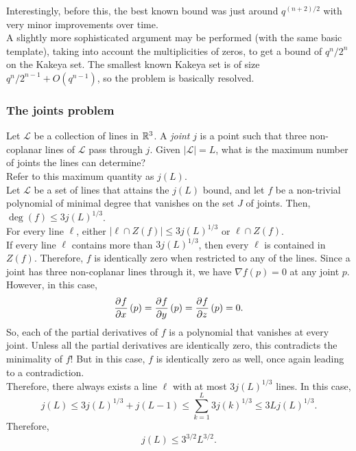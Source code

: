 		Interestingly, before this, the best known bound was just around $q^{(n+2)/2}$ with very minor improvements over time.\\
		A slightly more sophisticated argument may be performed (with the same basic template), taking into account the multiplicities of zeros, to get a bound of $q^n/2^n$ on the Kakeya set. The smallest known Kakeya set is of size $q^n/2^{n-1} + O(q^{n-1})$, so the problem is basically resolved.

	\subsubsection{The joints problem}

		Let $\mathcal{L}$ be a collection of lines in $\mathbb{R}^3$. A \emph{joint} $j$ is a point such that three non-coplanar lines of $\mathcal{L}$ pass through $j$. Given $|\mathcal{L}| = L$, what is the maximum number of joints the lines can determine? \\

		Refer to this maximum quantity as $j(L)$.\\
		Let $\mathcal{L}$ be a set of lines that attains the $j(L)$ bound, and let $f$ be a non-trivial polynomial of minimal degree that vanishes on the set $J$ of joints. Then, $\deg(f) \le 3j(L)^{1/3}$.\\

		For every line $\ell$, either $|\ell \cap Z(f)| \le 3j(L)^{1/3}$ or $\ell \cap Z(f)$.\\
		If every line $\ell$ contains more than $3j(L)^{1/3}$, then every $\ell$ is contained in $Z(f)$. Therefore, $f$ is identically zero when restricted to any of the lines. Since a joint has three non-coplanar lines through it, we have $\nabla f (p) = 0$ at any joint $p$. However, in this case,
		\[ \dpd{f}{x} (p) = \dpd{f}{y} (p) = \dpd{f}{z} (p) = 0. \]
		So, each of the partial derivatives of $f$ is a polynomial that vanishes at every joint. Unless all the partial derivatives are identically zero, this contradicts the minimality of $f$! But in this case, $f$ is identically zero as well, once again leading to a contradiction.\\

		Therefore, there always exists a line $\ell$ with at most $3j(L)^{1/3}$ lines. In this case,
		\[ j(L) \le 3j(L)^{1/3} + j(L-1) \le \sum_{k=1}^{L} 3j(k)^{1/3} \le 3Lj(L)^{1/3}. \]
		Therefore,
		\[ j(L) \le 3^{3/2} L^{3/2}. \]